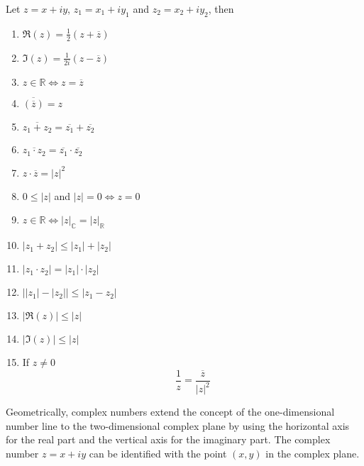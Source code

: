 \begin{proposition}
   Let \(z = x+iy\), \(z_1 = x_1 + iy_1\) and \(z_2 = x_2 + iy_2\), then
   \begin{enumerate}[label=\roman*, align=Center]
      \item \(\Re(z) = \frac{1}{2}(z + \overline{z})\)
      \item \(\Im(z) = \frac{1}{2i}(z - \overline{z})\)
      \item \(z \in \mathbb{R} \iff z = \overline{z}\)
      \item \(\overline{(\overline{z})} = z\)
      \item \(\overline{z_1 + z_2} = \overline{z_1} + \overline{z_2}\)
      \item \(\overline{z_1 \cdot z_2} = \overline{z_1} \cdot \overline{z_2}\)
      \item \(z \cdot \overline{z} = \lvert z \rvert^2\)
      \item \(0 \leq \lvert z\rvert\) and \(\lvert z\rvert = 0 \iff z = 0\)
      \item \(z \in \mathbb{R} \iff \lvert z \rvert_\mathbb{C} = \lvert z \rvert_\mathbb{R}\)
      \item \(|z_1 + z_2| \leq |z_1| + |z_2|\)
      \item \(|z_1 \cdot z_2| = |z_1| \cdot |z_2|\)
      \item \(\left\lvert \lvert z_1\rvert - \lvert z_2\rvert \right\rvert \leq \lvert z_1 - z_2\rvert\)
      \item \(|\Re(z)| \leq |z|\)
      \item \(|\Im(z)| \leq |z|\)
      \item If \(z \neq 0\)
         \[\frac{1}{z} = \frac{\overline{z}}{\lvert z \rvert^2}\]
   \end{enumerate}
\end{proposition}

Geometrically, complex numbers extend the concept of the one-dimensional number line to the two-dimensional complex plane by using the horizontal axis for the real part and the vertical axis for the imaginary part.
The complex number \(z = x + iy\) can be identified with the point \((x, y)\) in the complex plane.


